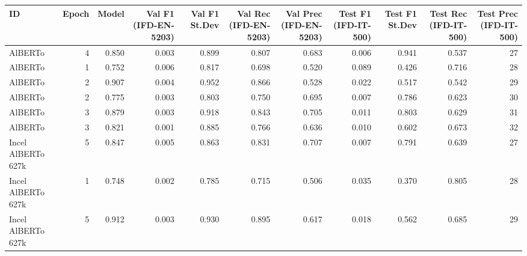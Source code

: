 \begin{tabular}{lrrrrrrrrrr}
\toprule
                ID &  Epoch &  Model &  Val F1 (IFD-EN-5203) &  Val F1 St.Dev &  Val Rec (IFD-EN-5203) &  Val Prec (IFD-EN-5203) &  Test F1 (IFD-IT-500) &  Test F1 St.Dev &  Test Rec (IFD-IT-500) &  Test Prec (IFD-IT-500) \\
\midrule
           AlBERTo &      4 &  0.850 &                 0.003 &          0.899 &                  0.807 &                   0.683 &                 0.006 &           0.941 &                  0.537 &                      27 \\
           AlBERTo &      1 &  0.752 &                 0.006 &          0.817 &                  0.698 &                   0.520 &                 0.089 &           0.426 &                  0.716 &                      28 \\
           AlBERTo &      2 &  0.907 &                 0.004 &          0.952 &                  0.866 &                   0.528 &                 0.022 &           0.517 &                  0.542 &                      29 \\
           AlBERTo &      2 &  0.775 &                 0.003 &          0.803 &                  0.750 &                   0.695 &                 0.007 &           0.786 &                  0.623 &                      30 \\
           AlBERTo &      3 &  0.879 &                 0.003 &          0.918 &                  0.843 &                   0.705 &                 0.011 &           0.803 &                  0.629 &                      31 \\
           AlBERTo &      3 &  0.821 &                 0.001 &          0.885 &                  0.766 &                   0.636 &                 0.010 &           0.602 &                  0.673 &                      32 \\
Incel AlBERTo 627k &      5 &  0.847 &                 0.005 &          0.863 &                  0.831 &                   0.707 &                 0.007 &           0.791 &                  0.639 &                      27 \\
Incel AlBERTo 627k &      1 &  0.748 &                 0.002 &          0.785 &                  0.715 &                   0.506 &                 0.035 &           0.370 &                  0.805 &                      28 \\
Incel AlBERTo 627k &      5 &  0.912 &                 0.003 &          0.930 &                  0.895 &                   0.617 &                 0.018 &           0.562 &                  0.685 &                      29 \\

\end{tabular}
